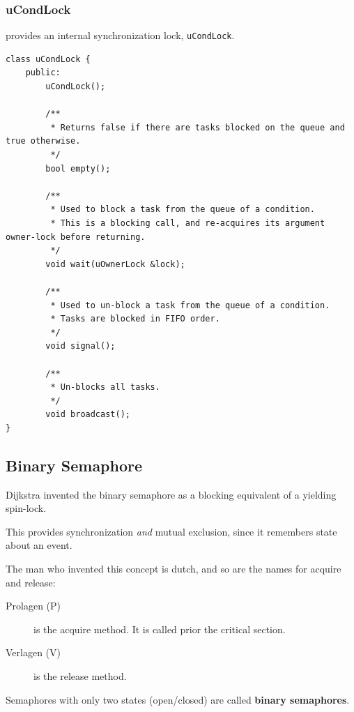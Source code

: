                 \subsubsection{uCondLock} %
                \label{ssub:ucondlock}
                    \uC provides an internal synchronization lock, \verb|uCondLock|.
                    \begin{lstlisting}
class uCondLock {
    public:
        uCondLock();

        /**
         * Returns false if there are tasks blocked on the queue and true otherwise.
         */
        bool empty();

        /**
         * Used to block a task from the queue of a condition.
         * This is a blocking call, and re-acquires its argument owner-lock before returning.
         */
        void wait(uOwnerLock &lock);

        /**
         * Used to un-block a task from the queue of a condition.
         * Tasks are blocked in FIFO order.
         */
        void signal();

        /**
         * Un-blocks all tasks.
         */
        void broadcast();
}
                    \end{lstlisting}
            \subsection{Binary Semaphore} %
            \label{sub:binary_semaphore}
                Dijkstra invented the binary semaphore as a blocking equivalent of a yielding spin-lock.

                This provides synchronization \textit{and} mutual exclusion, since it remembers state about an event.

                The man who invented this concept is dutch, and so are the names for acquire and release:
                \begin{description}
                    \item[Prolagen (P)] is the acquire method.
                        It is called prior the critical section.
                    \item[Verlagen (V)] is the release method.
                \end{description}
                Semaphores with only two states (open/closed) are called \textbf{binary semaphores}.
